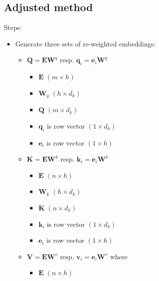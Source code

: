 \subsection*{Adjusted method}
Steps:
\begin{itemize}
    \item Generate three sets of re-weighted embeddings: 
    \begin{itemize}
        \item $\boldsymbol{Q} = \boldsymbol{E} \boldsymbol{W}^q$ resp. $\boldsymbol{q}_i = \boldsymbol{e}_i \boldsymbol{W}^q$
        \begin{multicols}{2}
        \begin{itemize}
            \item $\boldsymbol{E}$ $(m \times h)$
            \item $\boldsymbol{W}_q$ $(h \times d_k)$
            \item $\boldsymbol{Q}$ $(m \times d_k)$
            \item $\boldsymbol{q}_i$ is row vector $(1 \times d_k)$
            \item $\boldsymbol{e}_i$ is row vector $(1 \times h)$
        \end{itemize}
        \end{multicols}
        \item $\boldsymbol{K} = \boldsymbol{E} \boldsymbol{W}^k$ resp. $\boldsymbol{k}_i = \boldsymbol{e}_i \boldsymbol{W}^k$
        \begin{multicols}{2}
        \begin{itemize}
            \item $\boldsymbol{E}$ $(n \times h)$
            \item $\boldsymbol{W}_k$ $(h \times d_k)$
            \item $\boldsymbol{K}$ $(n \times d_k)$
            \item $\boldsymbol{k}_i$ is row vector $(1 \times d_k)$
            \item $\boldsymbol{e}_i$ is row vector $(1 \times h)$
        \end{itemize}
        \end{multicols}
        \item $\boldsymbol{V} = \boldsymbol{E} \boldsymbol{W}^v$ resp. $\boldsymbol{v}_i = \boldsymbol{e}_i \boldsymbol{W}^v$ where 
        \begin{multicols}{2}
        \begin{itemize}
            \item $\boldsymbol{E}$ $(n \times h)$

\end{itemize}
\end{multicols}
\end{itemize}
\end{itemize}
